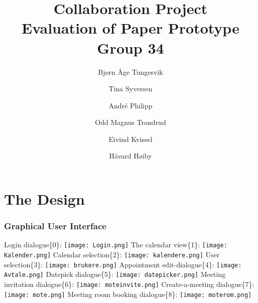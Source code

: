 \documentclass{article}
\begin{document}
\begin{titlepage}
\title{Collaboration Project\\
\textbf{Evaluation of Paper Prototype}\\
Group 34}
\author{Bj\o rn \AA ge Tungesvik\and Tina Syversen\and Andr\'e Philipp\and Odd Magnus Trondrud\and Eivind Kvissel\and H\aa vard H\o iby}
\maketitle
\end{titlepage}
\newpage

\part{The Design}

\section{Graphical User Interface}

Login dialogue\{0\}:\newline
\texttt{[image: Login.png]}\newline
The calendar view\{1\}: \newline
\texttt{[image: Kalender.png]}\newline
Calendar selection\{2\}: \newline
\texttt{[image: kalendere.png]}\newline
User selection\{3\}:\newline
\texttt{[image: brukere.png]}\newline
Appointment edit-dialogue\{4\}: \newline
\texttt{[image: Avtale.png]}\newline
Datepick dialogue\{5\}: \newline
\texttt{[image: datepicker.png]}\newline
Meeting invitation dialogue\{6\}: \newline
\texttt{[image: moteinvite.png]}\newline
Create-a-meeting dialogue\{7\}: \newline
\texttt{[image: mote.png]}\newline
Meeting room booking dialogue\{8\}: \newline
\texttt{[image: moterom.png]}
\end{document}
